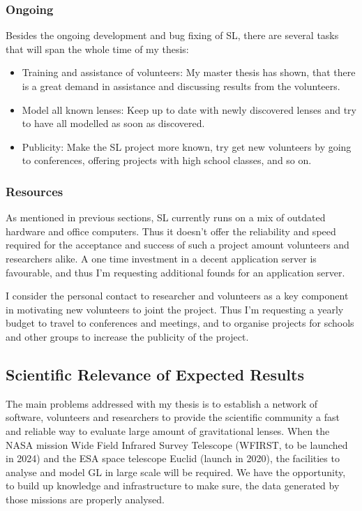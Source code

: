 \documentclass[11pt]{article}
\begin{document}
\subsubsection{Ongoing}
\label{sec:ongoing}

Besides the ongoing development and bug fixing of SL, there are several tasks that will span the whole time of my thesis:
\begin{itemize}
  \item Training and assistance of volunteers: My master thesis has shown, that there is a great demand in assistance and discussing results from the volunteers.
  \item Model all known lenses: Keep up to date with newly discovered lenses and try to have all modelled as soon as discovered.
  \item Publicity: Make the SL project more known, try get new volunteers by going to conferences, offering projects with high school classes, and so on.
\end{itemize}


\subsubsection{Resources}

As mentioned in previous sections, SL currently runs on a mix of outdated hardware and office computers.
Thus it doesn't offer the reliability and speed required for the acceptance and success of such a project amount volunteers and researchers alike.
A one time investment in a decent application server is favourable, and thus I'm requesting additional founds for an application server.

I consider the personal contact to researcher and volunteers as a key component in motivating new volunteers to joint the project.
Thus I'm requesting a yearly budget to travel to conferences and meetings, and to organise projects for schools and other groups to increase the publicity of the project.



\subsection{Scientific Relevance of Expected Results}

The main problems addressed with my thesis is to establish a network of software, volunteers and researchers to provide the scientific community a fast and reliable way to evaluate large amount of gravitational lenses.
When the NASA mission Wide Field Infrared Survey Telescope (WFIRST, to be launched in 2024) and the ESA space telescope Euclid (launch in 2020), the facilities to analyse and model GL in large scale will be required.
We have the opportunity, to build up knowledge and infrastructure to make sure, the data generated by those missions are properly analysed.
\end{document}
